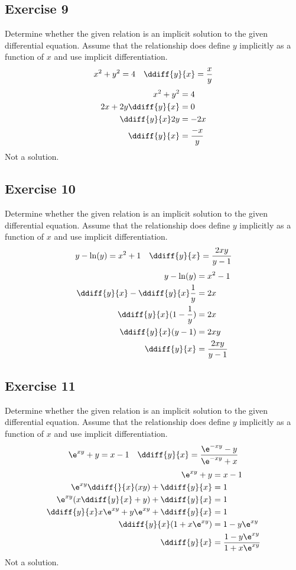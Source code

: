 \documentclass{math}
\begin{document}
\subsection*{Exercise 9}
Determine whether the given relation is an implicit solution to the given
differential equation. Assume that the relationship does define \( y \)
implicitly as a function of \( x \) and use implicit differentiation.
\[ x^2+y^2 = 4 \quad \ddiff{y}{x} = \frac{x}{y} \]
\begin{align*}
  x^2+y^2 &= 4 \\
  2x+2y\ddiff{y}{x} &= 0 \\
  \ddiff{y}{x}2y &= -2x \\
  \ddiff{y}{x} &= \frac{-x}{y}
\end{align*}
Not a solution.

\subsection*{Exercise 10}
Determine whether the given relation is an implicit solution to the given
differential equation. Assume that the relationship does define \( y \)
implicitly as a function of \( x \) and use implicit differentiation.
\[ y-\ln(y) = x^2+1 \quad \ddiff{y}{x} = \frac{2xy}{y-1} \]
\begin{align*}
  y-\ln(y) &= x^2-1 \\
  \ddiff{y}{x}-\ddiff{y}{x}\frac{1}{y} &= 2x \\
  \ddiff{y}{x}(1-\frac{1}{y}) &= 2x \\
  \ddiff{y}{x}(y-1) &= 2xy \\
  \ddiff{y}{x} &= \frac{2xy}{y-1}
\end{align*}

\subsection*{Exercise 11}
Determine whether the given relation is an implicit solution to the given
differential equation. Assume that the relationship does define \( y \)
implicitly as a function of \( x \) and use implicit differentiation.
\[ \e^{xy}+y = x-1 \quad \ddiff{y}{x} = \frac{\e^{-xy}-y}{\e^{-xy}+x} \]
\begin{align*}
  \e^{xy}+y &= x-1 \\
  \e^{xy}\ddiff{}{x}(xy)+\ddiff{y}{x} &= 1 \\
  \e^{xy}(x\ddiff{y}{x}+y)+\ddiff{y}{x} &= 1 \\
  \ddiff{y}{x}x\e^{xy}+y\e^{xy}+\ddiff{y}{x} &= 1 \\
  \ddiff{y}{x}(1+x\e^{xy}) &= 1-y\e^{xy} \\
  \ddiff{y}{x} &= \frac{1-y\e^{xy}}{1+x\e^{xy}}
\end{align*}
Not a solution.
\end{document}
